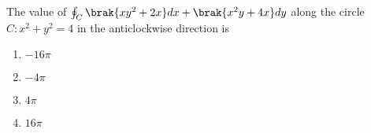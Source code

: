     \item The value of $\oint_{C} \brak{xy^2 + 2x}dx + \brak{x^2y + 4x}dy$ along the circle $C: x^2 + y^2=4$ in the anticlockwise direction is
        \begin{enumerate}
            \item $-16 \pi$
            \item $-4 \pi$
            \item $4 \pi$
            \item $16 \pi$
        \end{enumerate}
